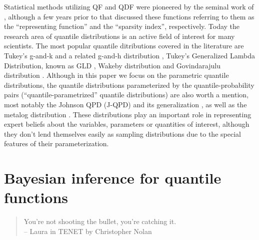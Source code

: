 \documentclass[
  12pt,
]{article}
\begin{document}
Statistical methods utilizing QF and QDF were pioneered by the seminal work of \citet{parzen1979NonparametricStatisticalData}, although a few years prior to that \citet{tukey1965WhichPartSample} discussed these functions referring to them as the ``representing function'' and the ``sparsity index'', respectively. Today the research area of quantile distributions is an active field of interest for many scientists. The most popular quantile ditributions covered in the literature are Tukey's g-and-k and a related g-and-h distribution \citep{haynes2005BayesianEstimationGandk, jacob2017LikelihoodCalculationGandk, prangle2017GkPackageGandk, rayner2002NumericalMaximumLikelihood}, Tukey's Generalized Lambda Distribution, known as GLD \citep{aldeni2017FamiliesDistributionsArising, chalabi2012FlexibleDistributionModeling, dedduwakumara2021EfficientEstimatorParameters, fournier2007EstimatingParametersGeneralizeda, freimer1988StudyGeneralizedTukey}, Wakeby distribution \citep{rahman2015ApplicabilityWakebyDistribution} and Govindarajulu distribution \citep{nair2012GovindarajuluDistributionProperties, nair2013QuantileBasedReliabilityAnalysis}. Although in this paper we focus on the parametric quantile distributions, the quantile distributions parameterized by the quantile-probability pairs (``quantile-parametrized'' quantile distributions) are also worth a mention, most notably the Johnson QPD (J-QPD) and its generalization \citep{hadlock2017JohnsonQuantileParameterizedDistributions, hadlock2019GeneralizedJohnsonQuantileParameterized}, as well as the metalog distribution \citep{keelin2016MetalogDistributions, keelin2011QuantileParameterizedDistributions}. These distributions play an important role in representing expert beliefs about the variables, parameters or quantities of interest, although they don't lend themselves easily as sampling distributions due to the special features of their parameterization.

\hypertarget{bayesian-inference-for-quantile-functions}{%
\section{Bayesian inference for quantile functions}\label{bayesian-inference-for-quantile-functions}}

\begin{quotation}
You're not shooting the bullet, you're catching it.\\
-- Laura in TENET by Christopher Nolan
\end{quotation}
\end{document}
